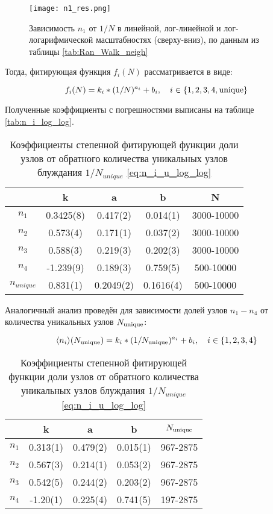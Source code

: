 \begin{figure}
\centering
\texttt{[image: n1\_res.png]}
\caption{Зависимость $n_1$ от $1/N$  в линейной, лог-линейной и лог-логарифмической масштабностях (сверху-вниз), по данным из таблицы \ref{tab:Ran_Walk_neigh}} 
\label{fig:n1_scale}
\end{figure}

Тогда, фитирующая функция $f_i(N)$ рассматривается в виде:

\begin{equation}
f_i(N) = k_i * (1/N)^{a_i} + b_i,\ \ \ i \in \{1,2,3,4, \textup{unique}\}
\label{eq:n_i_log_log}
\end{equation}

Полученные коэффициенты с погрешностями выписаны на таблице \ref{tab:n_i_log_log}.

\begin{table}[h]
\centering
\begin{tabular}{|c|c|c|c|c|}
\hline
 & k & a & b & N \\ \hline
$n_1$ & 0.3425(8) & 0.417(2) & 0.014(1) & 3000-10000 \\ \hline
$n_2$ & 0.573(4) & 0.171(1) & 0.037(2) & 3000-10000 \\ \hline
$n_3$ & 0.588(3) & 0.219(3) & 0.202(3) & 3000-10000 \\ \hline
$n_4$ & -1.239(9) & 0.189(3) & 0.759(5) & 500-10000 \\ \hline
$n_{unique}$ & 0.831(1) & 0.2049(2) & 0.1616(4) & 500-10000 \\ \hline
\end{tabular}
\caption{Коэффициенты степенной фитирующей функции доли узлов от обратного количества шагов блуждания $1/N$ \ref{eq:n_i_log_log}}
\label{tab:n_i_log_log}

Аналогичный анализ проведён для зависимости долей узлов $n_1 - n_4$ от количества уникальных узлов $N_{\textup{unique}}$:

\begin{equation}
\langle n_{i} \rangle (N_{\textup{unique}}) = k_i * (1/N_{\textup{unique}})^{a_i} + b_i,\ \ \ i \in \{1,2,3,4\}
\label{eq:n_i_u_log_log}
\end{equation}

\begin{tabular}{|c|c|c|c|c|}
\hline
 & k & a & b & $N_{\textup{unique}}$ \\ \hline
$n_1$ & 0.313(1) & 0.479(2) & 0.015(1) & 967-2875 \\ \hline
$n_2$ & 0.567(3) & 0.214(1) & 0.053(2) & 967-2875 \\ \hline
$n_3$  & 0.542(5) & 0.244(2) & 0.203(2) & 967-2875 \\ \hline
$n_4$ & -1.20(1) & 0.225(4) & 0.741(5) & 197-2875 \\ \hline
\end{tabular} 
\caption{Коэффициенты степенной фитирующей функции доли узлов от обратного количества уникальных узлов блуждания $1/N_{unique}$ \ref{eq:n_i_u_log_log}}
\label{tab:n_i_u_log_log}
\end{table}

